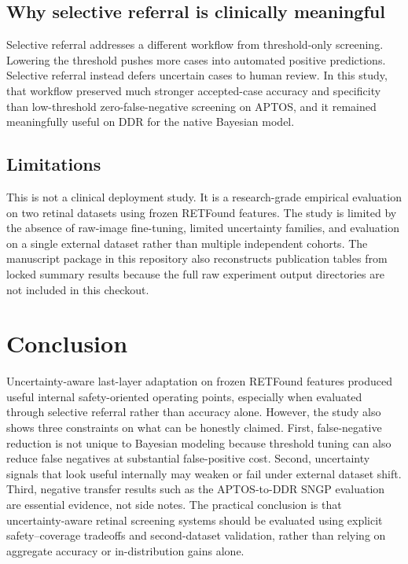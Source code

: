 \documentclass[11pt]{article}
\begin{document}
\subsection{Why selective referral is clinically meaningful}
Selective referral addresses a different workflow from threshold-only screening. Lowering the threshold pushes more cases into automated positive predictions. Selective referral instead defers uncertain cases to human review. In this study, that workflow preserved much stronger accepted-case accuracy and specificity than low-threshold zero-false-negative screening on APTOS, and it remained meaningfully useful on DDR for the native Bayesian model.

\subsection{Limitations}
This is not a clinical deployment study. It is a research-grade empirical evaluation on two retinal datasets using frozen RETFound features. The study is limited by the absence of raw-image fine-tuning, limited uncertainty families, and evaluation on a single external dataset rather than multiple independent cohorts. The manuscript package in this repository also reconstructs publication tables from locked summary results because the full raw experiment output directories are not included in this checkout.

\section{Conclusion}
Uncertainty-aware last-layer adaptation on frozen RETFound features produced useful internal safety-oriented operating points, especially when evaluated through selective referral rather than accuracy alone. However, the study also shows three constraints on what can be honestly claimed. First, false-negative reduction is not unique to Bayesian modeling because threshold tuning can also reduce false negatives at substantial false-positive cost. Second, uncertainty signals that look useful internally may weaken or fail under external dataset shift. Third, negative transfer results such as the APTOS-to-DDR SNGP evaluation are essential evidence, not side notes. The practical conclusion is that uncertainty-aware retinal screening systems should be evaluated using explicit safety--coverage tradeoffs and second-dataset validation, rather than relying on aggregate accuracy or in-distribution gains alone.
\end{document}
